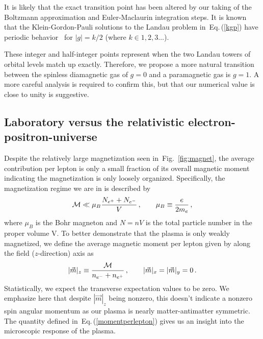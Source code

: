 \documentclass[aps,prd,floatfix,reprint]{revtex4-2}
\newcommand{\req}[1]{Eq.\,(\ref{#1})}
\newcommand{\rf}[1]{Fig.~{\ref{#1}}}
\begin{document}
It is likely that the exact transition point has been altered by our taking of the Boltzmann approximation and Euler-Maclaurin integration steps. It is known that the Klein-Gordon-Pauli solutions to the Landau problem in~\req{kgp} have periodic behavior~\cite{Steinmetz:2018ryf,Evans:2022fsu,Rafelski:2022bsv} for $|g|=k/2$ (where $k\in1,2,3\ldots$).

These integer and half-integer points represent when the two Landau towers of orbital levels match up exactly. Therefore, we propose a more natural transition between the spinless diamagnetic gas of $g=0$ and a paramagnetic gas is $g=1$. A more careful analysis is required to confirm this, but that our numerical value is close to unity is suggestive.

\subsection{Laboratory versus the relativistic electron-positron-universe}
\label{sec:perlepton}
\noindent Despite the relatively large magnetization seen in~\rf{fig:magnet}, the average contribution per lepton is only a small fraction of its overall magnetic moment indicating the magnetization is only loosely organized. Specifically, the magnetization regime we are in is described by
\begin{align}
 \label{fractionalmagnetization}
 {\cal M}\ll\mu_{B}\frac{N_{e^{+}}+N_{e^{-}}}{V}\,,\qquad\mu_{B}\equiv\frac{e}{2m_{e}}\,,
\end{align}
where $\mu_{B}$ is the Bohr magneton and $N=nV$ is the total particle number in the proper volume V. To better demonstrate that the plasma is only weakly magnetized, we define the average magnetic moment per lepton given by along the field ($z$-direction) axis as
\begin{align}
 \label{momentperlepton}
 \vert\vec{m}\vert_{z}\equiv\frac{{\cal M}}{n_{e^{-}}+n_{e^{+}}}\,,\qquad\vert\vec{m}\vert_{x}=\vert\vec{m}\vert_{y}=0\,.
\end{align}
Statistically, we expect the transverse expectation values to be zero. We emphasize here that despite $|\vec{m}|_{z}$ being nonzero, this doesn't indicate a nonzero spin angular momentum as our plasma is nearly matter-antimatter symmetric. The quantity defined in~\req{momentperlepton} gives us an insight into the microscopic response of the plasma.
\end{document}
